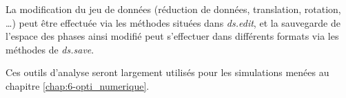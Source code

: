 \begin{refsection}
La modification du jeu de données (réduction de données, translation, rotation, …) peut être effectuée via les méthodes situées dans \textit{ds.edit}, et la sauvegarde de l'espace des phases ainsi modifié peut s'effectuer dans différents formats via les méthodes de \textit{ds.save}. 

Ces outils d'analyse seront largement utilisés pour les simulations menées au chapitre \ref{chap:6-opti_numerique}.

\newpage
\printbibliography[heading=subbibintoc]
\end{refsection}
